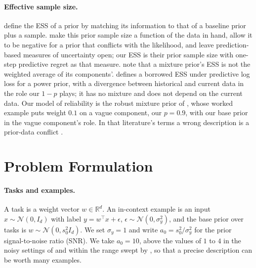 \documentclass[10pt]{article}
\newcommand{\R}{\mathbb{R}}
\begin{document}
\paragraph{Effective sample size.}
\citet{morita2008} define the ESS of a prior by matching its information to that of a baseline prior plus a sample. \citet{reimherr2021} make this prior sample size a function of the data in hand, allow it to be negative for a prior that conflicts with the likelihood, and leave prediction-based measures of uncertainty open; our ESS is their prior sample size with one-step predictive regret as that measure. \citet{neuenschwander2020} note that a mixture prior's ESS is not the weighted average of its components'. \citet{reznik2026} defines a borrowed ESS under predictive log loss for a power prior, with a divergence between historical and current data in the role our $1-p$ plays; it has no mixture and does not depend on the current data. Our model of reliability is the robust mixture prior of \citet{schmidli2014}, whose worked example puts weight $0.1$ on a vague component, our $p = 0.9$, with our base prior in the vague component's role. In that literature's terms a wrong description is a prior-data conflict \citep{evans2006}.

\section{Problem Formulation}\label{sec:setting}

\paragraph{Tasks and examples.}
A task is a weight vector $w \in \R^d$. An in-context example is an input $x \sim \mathcal{N}(0, I_d)$ with label $y = w^\top x + \epsilon$, $\epsilon \sim \mathcal{N}(0, \sigma_y^2)$, and the base prior over tasks is $w \sim \mathcal{N}(0, s_0^2 I_d)$. We set $\sigma_y = 1$ and write $a_0 = s_0^2/\sigma_y^2$ for the prior signal-to-noise ratio (SNR). We take $a_0 = 10$, above the values of $1$ to $4$ in the noisy settings of \citet{garg2022, raventos2023, panwar2024} and within the range swept by \citet{akyurek2023}, so that a precise description can be worth many examples.
\end{document}
